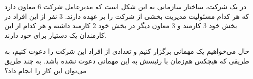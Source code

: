 \p
در یک شرکت، ساختار سازمانی به این شکل است که
    مدیرعامل شرکت 6 معاون دارد که هر کدام مسئولیت مدیریت بخشی از شرکت را بر عهده دارند.
3 نفر از این افراد در بخش خود 3 کارمند و 3 معاون دیگر در بخش خود 2 کارمند داشته و هر کدام از این کارمندان یک دستیار برای خود دارند. 
    
\p
حال می‌خواهیم یک مهمانی برگزار کنیم و تعدادی از افراد این شرکت را دعوت کنیم، 
    به طریقی که هیچکس هم‌زمان با رئیسش به این مهمانی دعوت نشده‌ باشد. 
    به چند طریق می‌توان این کار را انجام داد؟